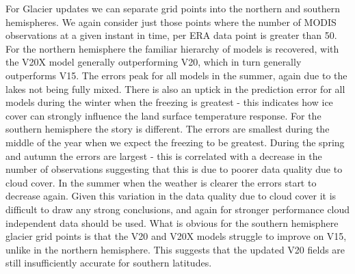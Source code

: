 \documentclass[twocolumn]{article}
\begin{document}
	\noindent For Glacier updates we can separate grid points into the northern and southern hemispheres. We again consider just those points where the number of MODIS observations at a given instant in time, per ERA data point is greater than 50. For the northern hemisphere the familiar hierarchy of models is recovered, with the V20X model generally outperforming V20, which in turn generally outperforms V15. The errors peak for all models in the summer, again due to the lakes not being fully mixed. There is also an uptick in the prediction error for all models during the winter when the freezing is greatest - this indicates how ice cover can strongly influence the land surface temperature response. For the southern hemisphere the story is different. The errors are smallest during the middle of the year when we expect the freezing to be greatest. During the spring and autumn the errors are largest - this is correlated with a decrease in the number of observations suggesting that this is due to poorer data quality due to cloud cover. In the summer when the weather is clearer the errors start to decrease again. Given this variation in the data quality due to cloud cover it is difficult to draw any strong conclusions, and again for stronger performance cloud independent data should be used. What is obvious for the southern hemisphere glacier grid points is that the V20 and V20X models struggle to improve on V15, unlike in the northern hemisphere. This suggests that the updated V20 fields are still insufficiently accurate for southern latitudes. \newline 
\end{document}
